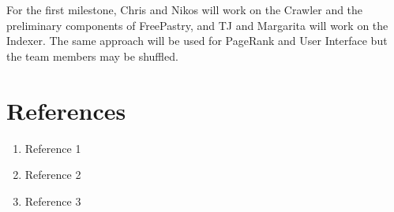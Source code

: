 \documentclass[11pt, letterpaper, oneside, twocolumn]{article}
\begin{document}
For the first milestone, Chris and Nikos will work on the Crawler and the preliminary components of FreePastry, and TJ and Margarita will work on the Indexer. The same approach will be used for PageRank and User Interface but the team members may be shuffled.


\section{References}

\begin{enumerate}
\item Reference 1
\item Reference 2
\item Reference 3
\end{enumerate}
\end{document}
